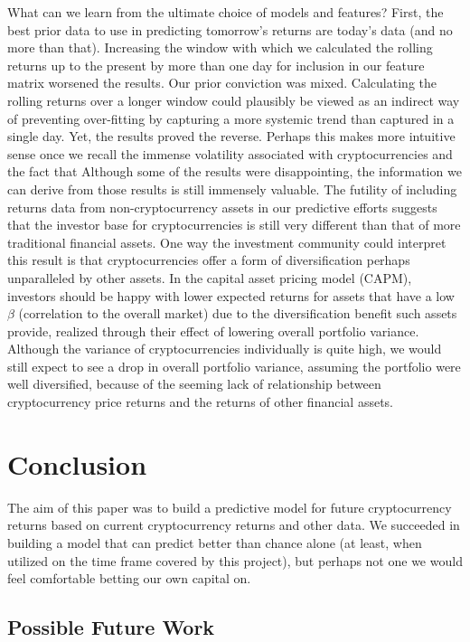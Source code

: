 \documentclass[12pt,twoside]{article}
\begin{document}
What can we learn from the ultimate choice of models and features? First, the best prior data to use in predicting tomorrow's returns are today's data (and no more than that). Increasing the window with which we calculated the rolling returns up to the present by more than one day for inclusion in our feature matrix worsened the results. Our prior conviction was mixed. Calculating the rolling returns over a longer window could plausibly be viewed as an indirect way of preventing over-fitting by capturing a more systemic trend than captured in a single day. Yet, the results proved the reverse. Perhaps this makes more intuitive sense once we recall the immense volatility associated with cryptocurrencies and the fact that 
\bigbreak
Although some of the results were disappointing, the information we can derive from those results is still immensely valuable. The futility of including returns data from non-cryptocurrency assets in our predictive efforts suggests that the investor base for cryptocurrencies is still very different than that of more traditional financial assets. One way the investment community could interpret this result is that cryptocurrencies offer a form of diversification perhaps unparalleled by other assets. In the capital asset pricing model (CAPM), investors should be happy with lower expected returns for assets that have a low $\beta$ (correlation to the overall market) due to the diversification benefit such assets provide, realized through their effect of lowering overall portfolio variance. Although the variance of cryptocurrencies individually is quite high, we would still expect to see a drop in overall portfolio variance, assuming the portfolio were well diversified, because of the seeming lack of relationship between cryptocurrency price returns and the returns of other financial assets.
\bigbreak


\section{Conclusion}

The aim of this paper was to build a predictive model for future cryptocurrency returns based on current cryptocurrency returns and other data. We succeeded in building a model that can predict better than chance alone (at least, when utilized on the time frame covered by this project), but perhaps not one we would feel comfortable betting our own capital on.

\subsection{Possible Future Work}
\end{document}
